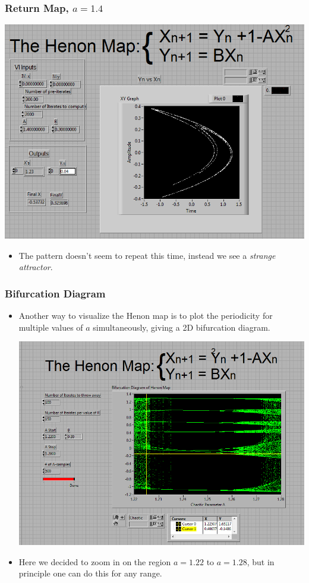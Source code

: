 \documentclass[9pt]{beamer}
\begin{document}
\begin{frame}
	\frametitle{Return Map, \( a = 1.4 \)}

	\begin{center}
		\includegraphics[scale=0.4]{images/HenonMap_1.4.PNG}	
	\end{center}
	\begin{itemize}
		\item The pattern doesn't seem to repeat this time, instead we see a
			\textit{strange attractor}.
	\end{itemize}
\end{frame}

\begin{frame}
	\frametitle{Bifurcation Diagram}
	\begin{itemize}
		\item Another way to visualize the Henon map is to plot the periodicity for
			multiple values of \( a \) simultaneously, giving a 2D bifurcation
			diagram. 

			\begin{center}
				\includegraphics[scale=0.3]{images/HenonBifr.PNG}
			\end{center}
		\item Here we decided to zoom in on the region \( a = 1.22 \) to \( a = 1.28
			\), but in principle one can do this for any range. 
	\end{itemize}
\end{frame}
\end{document}
